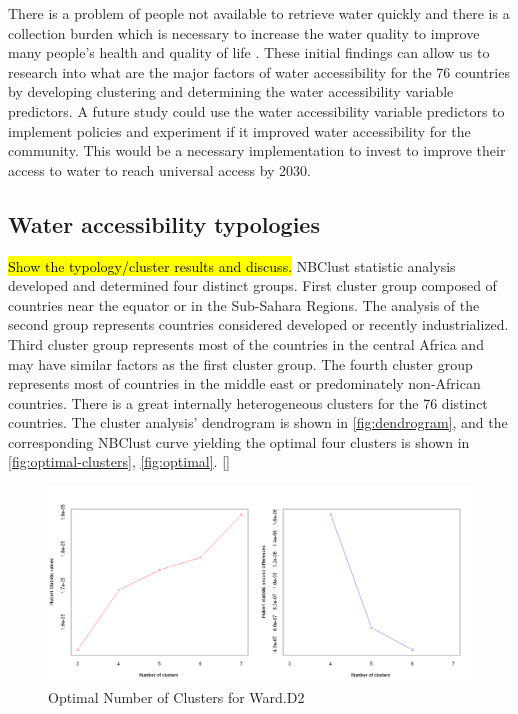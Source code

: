 \documentclass[10pt,twoside]{article}
\numberwithin{equation}{section}
\newcommand{\?}{\stackrel{?}{=}}
\begin{document}
There is a problem of people not available to retrieve water quickly and there is a collection burden which is necessary to increase the water quality to improve many people's health and quality of life \citep{cassivi2018access}. These initial findings can allow us to research into what are the major factors of water accessibility for the 76 countries by developing clustering and determining the water accessibility variable predictors. A future study could use the water accessibility variable predictors to implement policies and experiment if it improved water accessibility for the community. This would be a necessary implementation to invest to improve their access to water to reach universal access by 2030.



\subsection*{Water accessibility typologies}
\hl{Show the typology/cluster results and discuss.}
NBClust statistic analysis developed and determined four distinct groups. First cluster group composed of countries near the equator or in the Sub-Sahara Regions. The analysis of the second group represents countries considered developed or recently industrialized. Third cluster group represents most of the countries in the central Africa and may have similar factors as the first cluster group. The fourth cluster group represents most of countries in the middle east or predominately non-African countries. There is a great internally heterogeneous clusters for the 76 distinct countries. The cluster analysis' dendrogram is shown in \autoref{fig:dendrogram}, and the corresponding NBClust curve yielding the optimal four clusters is shown in \autoref{fig:optimal-clusters}, \autoref{fig:optimal}. \autoref{}


\begin{figure}[h!]
  \centering
  \includegraphics[width=.7\textwidth]{optimal-clusters-ward-d2}
  \caption{Optimal Number of Clusters for Ward.D2}
  \label{fig:optimal-clusters}
\end{figure}
\end{document}
